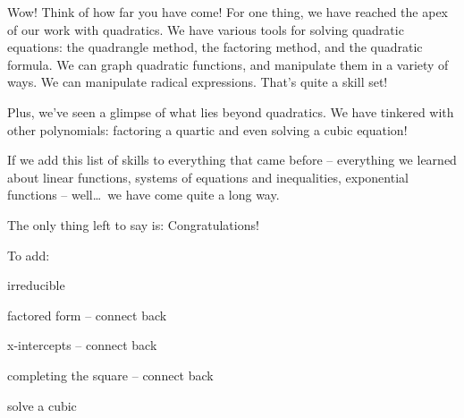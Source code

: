 \chaptersummary

Wow! Think of how far you have come! For one thing, we have reached the apex of our work with quadratics. We have various tools for solving quadratic equations: the quadrangle method, the factoring method, and the quadratic formula. We can graph quadratic functions, and manipulate them in a variety of ways. We can manipulate radical expressions. That's quite a skill set!

Plus, we've seen a glimpse of what lies beyond quadratics. We have tinkered with other polynomials: factoring a quartic and even solving a cubic equation!

If we add this list of skills to everything that came before -- everything we learned about linear functions, systems of equations and inequalities, exponential functions -- well\ldots\ we have come quite a long way.

The only thing left to say is: Congratulations! 




To add:

irreducible

factored form -- connect back

x-intercepts -- connect back

completing the square -- connect back

solve a cubic
